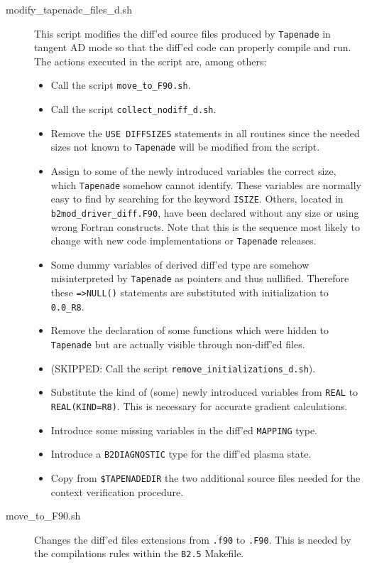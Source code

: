 \begin{sloppypar}
\begin{description}
  \item[modify\_tapenade\_files\_d.sh] This script modifies the diff'ed source files produced by {\tt Tapenade} in tangent AD mode so that the diff'ed code can properly compile and run. The actions executed in the script are, among others:
    \begin{itemize}
      \item Call the script {\tt move\_to\_F90.sh}.
      \item Call the script {\tt collect\_nodiff\_d.sh}.
      \item Remove the {\tt USE DIFFSIZES} statements in all routines since the needed sizes not known to {\tt Tapenade} will be modified from the script.
      \item Assign to some of the newly introduced variables the correct size, which {\tt Tapenade} somehow cannot identify. These variables are normally easy to find by searching for the keyword {\tt ISIZE}. Others, located in {\tt b2mod\_driver\_diff.F90}, have been declared without any size or using wrong Fortran constructs. Note that this is the sequence most likely to change with new code implementations or {\tt Tapenade} releases.
      \item Some dummy variables of derived diff'ed type are somehow misinterpreted by {\tt Tapenade} as pointers and thus nullified. Therefore these {\tt =>NULL()} statements are substituted with initialization to {\tt 0.0\_R8}.
      \item Remove the declaration of some functions which were hidden to {\tt Tapenade} but are actually visible through non-diff'ed files.
      \item (SKIPPED: Call the script {\tt remove\_initializations\_d.sh}).
      \item Substitute the kind of (some) newly introduced variables from {\tt REAL} to {\tt REAL(KIND=R8)}. This is necessary for accurate gradient calculations.
      \item Introduce some missing variables in the diff'ed {\tt MAPPING} type.
      \item Introduce a {\tt B2DIAGNOSTIC} type for the diff'ed plasma state.
      \item Copy from {\tt \$TAPENADEDIR} the two additional source files needed for the context verification procedure.
    \end{itemize}

  \item[move\_to\_F90.sh] Changes the diff'ed files extensions from {\tt .f90} to {\tt .F90}. This is needed by the compilations rules within the {\tt B2.5} Makefile.


\end{description}
\end{sloppypar}
